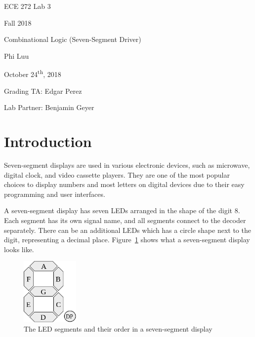 \documentclass[12pt]{article}
\begin{document}
\begin{titlepage}
  \begin{center} \LARGE
    \vspace*{1.5in}

    ECE 272 Lab 3

    Fall 2018

    \vfill

    Combinational Logic (Seven-Segment Driver)

    Phi Luu

    \vfill

    October 24\textsuperscript{th}, 2018

    Grading TA: Edgar Perez

    Lab Partner: Benjamin Geyer

    \vspace{1.5in}
  \end{center}
\end{titlepage}

\section{Introduction}

Seven-segment displays are used in various electronic devices, such as microwave, digital clock, and video cassette players. They are one of the most popular choices to display numbers and most letters on digital devices due to their easy programming and user interfaces.

A seven-segment display has seven LEDs arranged in the shape of the digit 8. Each segment has its own signal name, and all segments connect to the decoder separately. There can be an additional LEDs which has a circle shape next to the digit, representing a decimal place. Figure~\ref{figure:1} shows what a seven-segment display looks like.

\begin{figure}[h]
  \centering
  \includegraphics[width=0.25\textwidth]{seven_segment_display.png}
  \caption{The LED segments and their order in a seven-segment display\cite{WikimediaSevenSegment}}
  \label{figure:1}
\end{figure}
\end{document}
